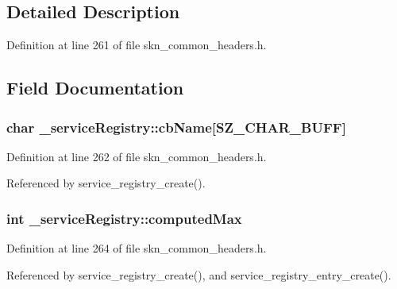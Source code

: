 \subsection{Detailed Description}


Definition at line 261 of file skn\+\_\+common\+\_\+headers.\+h.



\subsection{Field Documentation}
\hypertarget{struct__service_registry_ab822dc7bf25dc0eb498e81f81581e448}{}
\subsubsection[{cb\+Name}]{\setlength{\rightskip}{0pt plus 5cm}char \+\_\+service\+Registry\+::cb\+Name\mbox{[}{\bf S\+Z\+\_\+\+C\+H\+A\+R\+\_\+\+B\+U\+F\+F}\mbox{]}}\label{struct__service_registry_ab822dc7bf25dc0eb498e81f81581e448}


Definition at line 262 of file skn\+\_\+common\+\_\+headers.\+h.



Referenced by service\+\_\+registry\+\_\+create().

\hypertarget{struct__service_registry_afc84b25f775a67d768cf4915db3c7115}{}
\subsubsection[{computed\+Max}]{\setlength{\rightskip}{0pt plus 5cm}int \+\_\+service\+Registry\+::computed\+Max}\label{struct__service_registry_afc84b25f775a67d768cf4915db3c7115}


Definition at line 264 of file skn\+\_\+common\+\_\+headers.\+h.



Referenced by service\+\_\+registry\+\_\+create(), and service\+\_\+registry\+\_\+entry\+\_\+create().

\hypertarget{struct__service_registry_a68062b14c6c9cb411e3602be664425bc}{}
